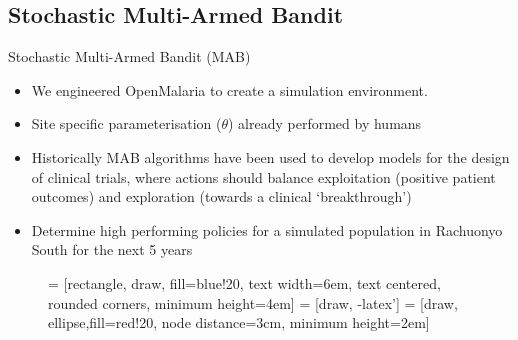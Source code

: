 \documentclass[10pt,usenames,dvipsnames]{beamer}
\begin{document}
\subsection{Stochastic Multi-Armed Bandit}
\begin{frame}{Stochastic Multi-Armed Bandit (MAB)}

\begin{itemize}
\item We engineered OpenMalaria to create a simulation environment.
\item Site specific parameterisation ($\theta$) already performed by humans \cite{Stuckey2012}
\item Historically MAB algorithms have been used to develop models for the design of clinical trials, where actions should balance exploitation (positive patient outcomes) and exploration (towards a clinical `breakthrough')
\item  Determine high performing policies for a simulated population in Rachuonyo South for the next 5 years
\end{itemize}

\begin{figure}[!t]
\centering
{} = [rectangle, draw, fill=blue!20, 
    text width=6em, text centered, rounded corners, minimum height=4em]
 = [draw, -latex']
 = [draw, ellipse,fill=red!20, node distance=3cm,
    minimum height=2em]
    
\label{fig_flow}
\end{figure}

\end{frame}
\end{document}
